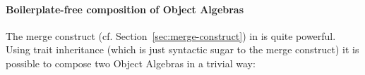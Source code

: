 

\paragraph{Boilerplate-free composition of Object Algebras}
The merge construct (cf. Section~\ref{sec:merge-construct}) in \name is quite
powerful. Using trait inheritance (which is just syntactic sugar to the merge
construct) it is possible to compose two Object Algebras in a trivial way:



